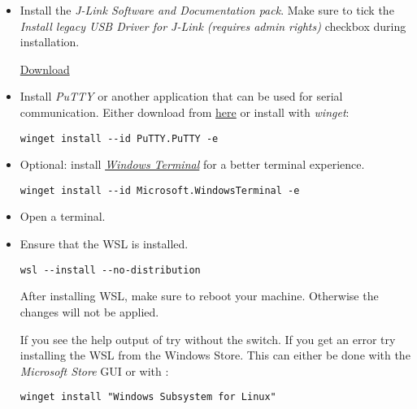 \begin{itemize}
  \item Install the \emph{J-Link Software and Documentation pack}.
        Make sure to tick the \emph{Install legacy USB Driver for J-Link (requires admin rights)} checkbox during installation.

        \href{https://www.segger.com/downloads/jlink/JLink_Windows_x86_64.exe}{Download}

  \item Install \emph{PuTTY} or another application that can be used for serial
        communication.
        Either download from \href{https://putty.org/}{here} or install with \emph{winget}:

        \begin{lstlisting}
winget install --id PuTTY.PuTTY -e
\end{lstlisting}

  \item Optional: install \href{https://aka.ms/terminal}{\emph{Windows Terminal}} for a better terminal experience.

        \begin{lstlisting}
winget install --id Microsoft.WindowsTerminal -e
\end{lstlisting}

  \item Open a terminal.

  \item Ensure that the WSL is installed.
        \begin{lstlisting}
wsl --install --no-distribution
\end{lstlisting}

        \begin{infobox}
          After installing WSL, make sure to reboot your machine.
          Otherwise the changes will not be applied.
        \end{infobox}

        \begin{infobox}
          If you see the help output of  try without the  switch.
          If you get an error try installing the WSL from the Windows Store.
          This can either be done with the \emph{Microsoft Store} GUI or with :

          \begin{lstlisting}
winget install "Windows Subsystem for Linux"
\end{lstlisting}


\end{infobox}
\end{itemize}
